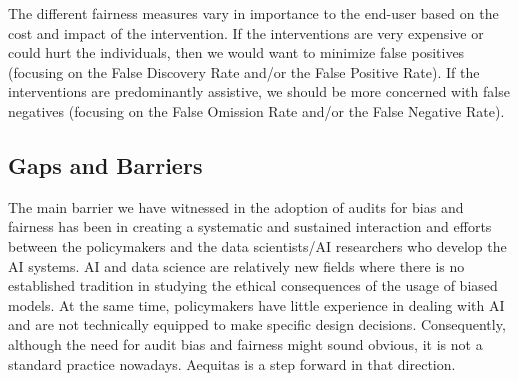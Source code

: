 The different fairness measures vary in importance to the end-user based on the cost and impact of the intervention. If the interventions are very expensive or could hurt the individuals, then we would want to minimize false positives (focusing on the False Discovery Rate and/or the False Positive Rate). If the interventions are predominantly assistive, we should be more concerned with false negatives (focusing on the False Omission Rate and/or the False Negative Rate). 

\subsection{Gaps and Barriers}

The main barrier we have witnessed in the adoption of audits for bias and fairness has been in creating a systematic and sustained interaction and efforts between the policymakers and the data scientists/AI researchers who develop the AI systems. AI and data science are relatively new fields where there is no established tradition in studying the ethical consequences of the usage of biased models. At the same time, policymakers have little experience in dealing with AI and are not technically equipped to make specific design decisions. Consequently, although the need for audit bias and fairness might sound obvious, it is not a standard practice nowadays. Aequitas is a step forward in that direction.

